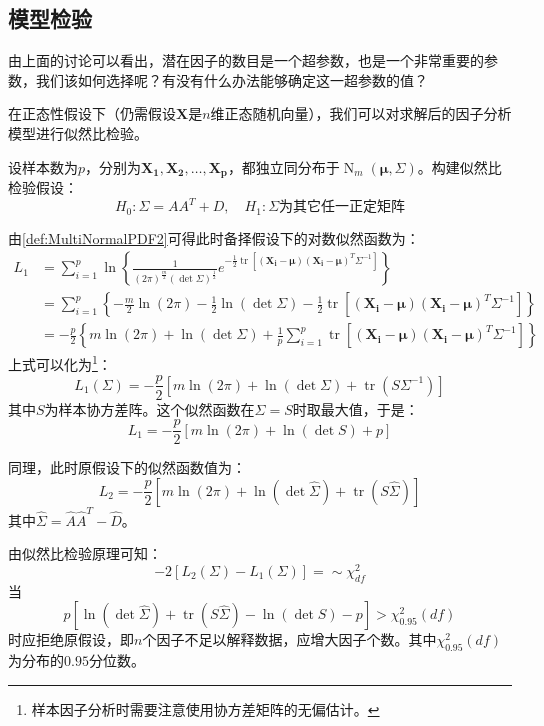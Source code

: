 \subsection{模型检验}
由上面的讨论可以看出，潜在因子的数目是一个超参数，也是一个非常重要的参数，我们该如何选择呢？有没有什么办法能够确定这一超参数的值？\par
\begin{derivation}
	在正态性假设下（仍需假设$\mathbf{X}$是$n$维正态随机向量），我们可以对求解后的因子分析模型进行似然比检验。\par
	设样本数为$p$，分别为$\mathbf{X_1},\mathbf{X_2},\dots,\mathbf{X_p}$，都独立同分布于$\operatorname{N}_m(\boldsymbol{\mu},\Sigma)$。构建似然比检验假设：
	\begin{equation*}
		H_0:\Sigma=AA^T+D,\quad H_1:\Sigma\text{为其它任一正定矩阵}
	\end{equation*}\par
	由\cref{def:MultiNormalPDF2}可得此时备择假设下的对数似然函数为：
	\begin{align*}
		L_1&=\sum_{i=1}^{p}\ln\left\{\frac{1}{(2\pi)^{\frac{m}{2}}(\det\Sigma)^{\frac{1}{2}}}e^{-\frac{1}{2}\operatorname{tr}[(\mathbf{X_i}-\boldsymbol{\mu})(\mathbf{X_i}-\boldsymbol{\mu})^T\Sigma^{-1}]}\right\} \\
		&=\sum_{i=1}^{p}\left\{-\frac{m}{2}\ln(2\pi)-\frac{1}{2}\ln(\det\Sigma)-\frac{1}{2}\operatorname{tr}[(\mathbf{X_i}-\boldsymbol{\mu})(\mathbf{X_i}-\boldsymbol{\mu})^T\Sigma^{-1}]\right\} \\
		&=-\frac{p}{2}\left\{m\ln(2\pi)+\ln(\det\Sigma)+\frac{1}{p}\sum_{i=1}^{p}\operatorname{tr}[(\mathbf{X_i}-\boldsymbol{\mu})(\mathbf{X_i}-\boldsymbol{\mu})^T\Sigma^{-1}]\right\}
	\end{align*}
	上式可以化为\footnote{样本因子分析时需要注意使用协方差矩阵的无偏估计。}：
	\begin{equation*}
		L_1(\Sigma)=-\frac{p}{2}\left[m\ln(2\pi)+\ln(\det\Sigma)+\operatorname{tr}(S\Sigma^{-1})\right]
	\end{equation*}
	其中$S$为样本协方差阵。这个似然函数在$\Sigma=S$时取最大值，于是：
	\begin{equation*}
		L_1=-\frac{p}{2}[m\ln(2\pi)+\ln(\det S)+p]
	\end{equation*}\par
	同理，此时原假设下的似然函数值为：
	\begin{equation*}
		L_2=-\frac{p}{2}\left[m\ln(2\pi)+\ln(\det\hat{\Sigma})+\operatorname{tr}(S\hat{\Sigma})\right]
	\end{equation*}
	其中$\hat{\Sigma}=\hat{A}\hat{A}^T-\hat{D}$。\par
	由似然比检验原理可知：
	\begin{equation*}
	-2[L_2(\Sigma)-L_1(\Sigma)]=\sim\chi^2_{df}
	\end{equation*}
	当
	\begin{equation*}
		p[\ln(\det\hat{\Sigma})+\operatorname{tr}(S\hat{\Sigma})-\ln(\det S)-p]>\chi^2_{0.95}(df)
	\end{equation*}
	时应拒绝原假设，即$n$个因子不足以解释数据，应增大因子个数。其中$\chi^2_{0.95}(df)$为分布的$0.95$分位数。
\end{derivation}


